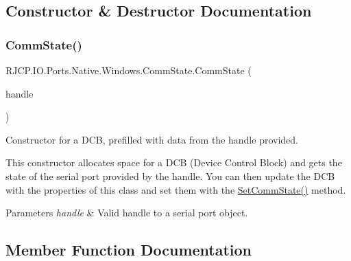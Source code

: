 \subsection{Constructor \& Destructor Documentation}
\mbox{\label{class_r_j_c_p_1_1_i_o_1_1_ports_1_1_native_1_1_windows_1_1_comm_state_ad765599175205c01fa309c8e7f11c42f}} 
\subsubsection{\texorpdfstring{CommState()}{CommState()}}
{\footnotesize\ttfamily R\+J\+C\+P.\+I\+O.\+Ports.\+Native.\+Windows.\+Comm\+State.\+Comm\+State (\begin{DoxyParamCaption}\item[{Safe\+File\+Handle}]{handle }\end{DoxyParamCaption})}



Constructor for a D\+CB, prefilled with data from the handle provided. 

This constructor allocates space for a D\+CB (Device Control Block) and gets the state of the serial port provided by the handle. You can then update the D\+CB with the properties of this class and set them with the \mbox{\hyperlink{class_r_j_c_p_1_1_i_o_1_1_ports_1_1_native_1_1_windows_1_1_comm_state_a0a20f9d712c5ad860155845b1dffd56b}{Set\+Comm\+State()}} method. 


\begin{DoxyParams}{Parameters}
{\em handle} & Valid handle to a serial port object.\\
\hline
\end{DoxyParams}


\subsection{Member Function Documentation}
\mbox{\label{class_r_j_c_p_1_1_i_o_1_1_ports_1_1_native_1_1_windows_1_1_comm_state_a49fb7ac8787598bf4f135c6a867ec59e}} 
